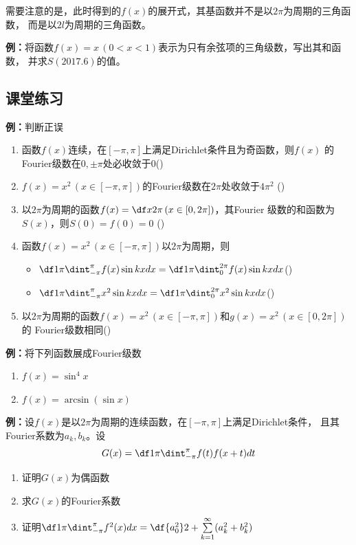 需要注意的是，此时得到的$f(x)$的展开式，其基函数并不是以$2\pi$为周期的三角函数，
而是以$2l$为周期的三角函数。

{\bf 例：}将函数$f(x)=x\,(0<x<1)$表示为只有余弦项的三角级数，写出其和函数，
并求$S(2017.6)$的值。

\subsection{课堂练习}

{\bf 例：}判断正误
\begin{enumerate}[(1)]
  \setlength{\itemindent}{1cm}
  \item 函数$f(x)$连续，在$[-\pi,\pi]$上满足Dirichlet条件且为奇函数，则$f(x)$
  的Fourier级数在$0,\pm\pi$处必收敛于$0$\quad  (\;{$\surd$}\;) 
  \item $f(x)=x^2\,(x\in[-\pi,\pi])$的Fourier级数在$2\pi$处收敛于$4\pi^2$
    \quad(\;{$\times$}\;) 
  \item 以$2\pi$为周期的函数$f(x)=\df x{2\pi}\,(x\in[0,2\pi])$，其Fourier
  级数的和函数为$S(x)$，则$S(0)=f(0)=0$ 
  \quad (\;{$\times$}\;)
  \item 函数$f(x)=x^2\,(x\in[-\pi,\pi])$以$2\pi$为周期，则 
  \begin{itemize}
    \item $\df 1{\pi}\dint_{-\pi}^{\pi}f(x)\sin kxdx=\df
    1{\pi}\dint_{0}^{2\pi}f(x)\sin kxdx$\quad (\;{$\surd$}\;) 
    \item $\df 1{\pi}\dint_{-\pi}^{\pi}x^2\sin kxdx=\df
    1{\pi}\dint_{0}^{2\pi}x^2\sin kxdx$\quad (\;{$\times$}\;) 
  \end{itemize}
  \item 以$2\pi$为周期的函数$f(x)=x^2\,(x\in[-\pi,\pi])$和$g(x)=x^2\,(x\in[0,2\pi])$的
  Fourier级数相同\quad (\;{$\times$}\;)
\end{enumerate}

{\bf 例：}将下列函数展成Fourier级数
\begin{enumerate}[(1)]
  \setlength{\itemindent}{1cm}
  \item $f(x)=\sin^4x$
  \item $f(x)=\arcsin(\sin x)$
\end{enumerate}

{\bf 例：}设$f(x)$是以$2\pi$为周期的连续函数，在$[-\pi,\pi]$上满足Dirichlet条件，
且其Fourier系数为$a_k,b_k$。设
$$G(x)=\df1{\pi}\dint_{-\pi}^{\pi}f(t)f(x+t)dt$$
\begin{enumerate}[(1)]
  \setlength{\itemindent}{1cm}
  \item 证明$G(x)$为偶函数
  \item 求$G(x)$的Fourier系数
  \item 证明$\df1{\pi}\dint_{-\pi}^{\pi}f^2(x)dx=\df{a_0^2}2+
  \sum\limits_{k=1}^{\infty}(a_k^2+b_k^2)$
\end{enumerate}

